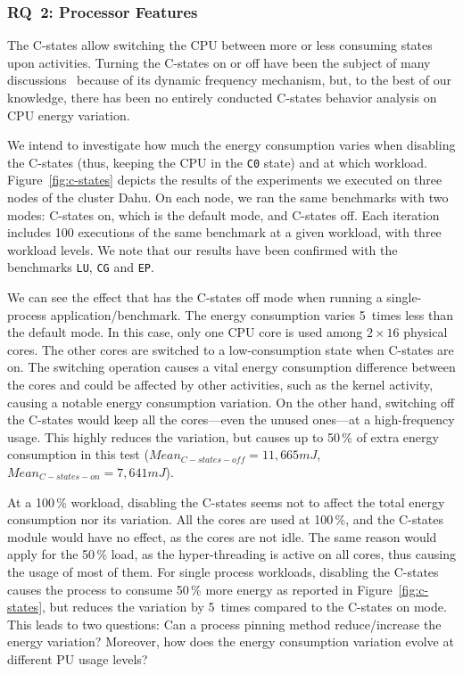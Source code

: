 \subsubsection{\textsc{RQ}~2: Processor Features}
The C-states allow switching the CPU between more or less consuming states upon activities.
Turning the C-states on or off have been the subject of many discussions~\cite{5463056} because of its dynamic frequency mechanism, but, to the best of our knowledge, there has been no entirely conducted C-states behavior analysis on CPU energy variation.

We intend to investigate how much the energy consumption varies when disabling the C-states (thus, keeping the CPU in the \texttt{C0} state) and at which workload.
Figure~\ref{fig:c-states} depicts the results of the experiments we executed on three nodes of the cluster \textsf{Dahu}.
On each node, we ran the same benchmarks with two modes: \textsf{C-states on}, which is the default mode, and \textsf{C-states off}.
Each iteration includes 100 executions of the same benchmark at a given workload, with three workload levels.
We note that our results have been confirmed with the benchmarks \texttt{LU}, \texttt{CG} and \texttt{EP}.

We can see the effect that has the \textsf{C-states off} mode when running a single-process application/benchmark.
The energy consumption varies 5~times less than the default mode.
In this case, only one CPU core is used among $2\times16$ physical cores.
The other cores are switched to a low-consumption state when C-states are on. The switching operation causes a vital energy consumption difference between the cores and could be affected by other activities, such as the kernel activity, causing a notable energy consumption variation.
On the other hand, switching off the C-states would keep all the cores---even the unused ones---at a high-frequency usage.
This highly reduces the variation, but causes up to 50\,\% of extra energy consumption in this test ($Mean_{C-states-off}=11,665 mJ$,$Mean_{C-states-on}=7,641 mJ$).

At a 100\,\% workload, disabling the C-states seems not to affect the total energy consumption nor its variation.
All the cores are used at 100\,\%, and the C-states module would have no effect, as the cores are not idle.
The same reason would apply for the 50\,\% load, as the hyper-threading is active on all cores, thus causing the usage of most of them.
For single process workloads, disabling the C-states causes the process to consume 50\,\% more energy as reported in Figure~\ref{fig:c-states}, but reduces the variation by 5~times compared to the \textsf{C-states on} mode.
This leads to two questions: Can a process pinning method reduce/increase the energy variation? Moreover, how does the energy consumption variation evolve at different PU usage levels?


